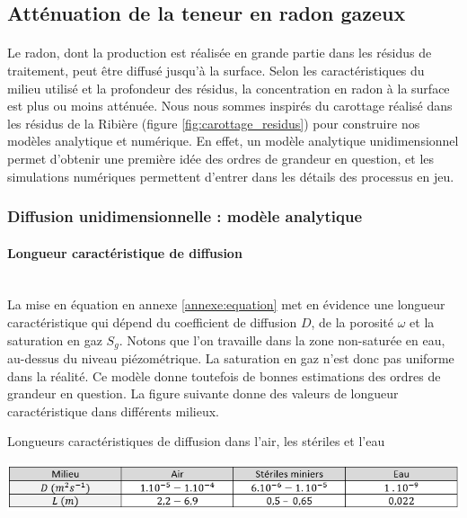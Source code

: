 \documentclass{article}
\begin{document}
\subsection{Atténuation de la teneur en radon gazeux}

\paragraph{} Le radon, dont la production est réalisée en grande partie dans les résidus de traitement, peut être diffusé jusqu’à la surface. Selon les caractéristiques du milieu utilisé et la profondeur des résidus, la concentration en radon à la surface est plus ou moins atténuée. Nous nous sommes inspirés du carottage réalisé dans les résidus de la Ribière (figure \ref{fig:carottage_residus}) pour construire nos modèles analytique et numérique. En effet, un modèle analytique unidimensionnel permet d’obtenir une première idée des ordres de grandeur en question, et les simulations numériques permettent d'entrer dans les détails des processus en jeu.

\subsubsection{Diffusion unidimensionnelle : modèle analytique}

\paragraph{Longueur caractéristique de diffusion \\ \\} La mise en équation en annexe \ref{annexe:equation} met en évidence une longueur caractéristique qui dépend du coefficient de diffusion $D$, de la porosité $\omega$ et la saturation en gaz $S_g$. Notons que l’on travaille dans la zone non-saturée en eau, au-dessus du niveau piézométrique. La saturation en gaz n’est donc pas uniforme dans la réalité. Ce modèle donne toutefois de bonnes estimations des ordres de grandeur en question. La figure suivante donne des valeurs de longueur caractéristique dans différents milieux.

\begin{table}[H]
    \centering
    \caption{Longueurs caractéristiques de diffusion dans l'air, les stériles et l'eau}
    \includegraphics[width = \linewidth]{III_C_2.png}

    \label{tab:longueur_diffusion}
\end{table}
\end{document}
